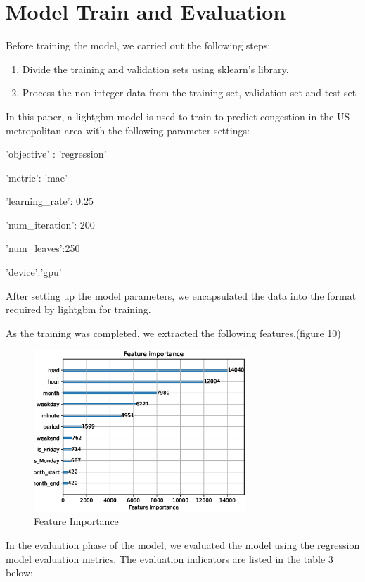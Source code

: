\section{Model Train and Evaluation} \label{sec-experiment}
Before training the model, we carried out the following steps:\par
\begin{enumerate}
	\item Divide the training and validation sets using sklearn's library.
	\item Process the non-integer data from the training set, validation set and test set
\end{enumerate}\par
In this paper, a lightgbm model is used to train to predict congestion in the US metropolitan area with the following parameter settings:\par
'objective' : 'regression'\par
'metric': 'mae'\par
'learning_rate': 0.25\par
'num_iteration': 200\par
'num_leaves':250\par
'device':'gpu'\par
After setting up the model parameters, we encapsulated the data into the format required by lightgbm for training.\par
As the training was completed, we extracted the following features.(figure 10)\par
\begin{figure}[h]
	\includegraphics[width=8cm]{figure/feature_importance.eps}
	\caption{Feature Importance}
\end{figure}\par
In the evaluation phase of the model, we evaluated the model using the regression model evaluation metrics. The evaluation indicators are listed in the table 3 below:\par
